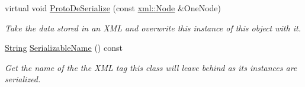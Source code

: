 \begin{DoxyCompactItemize}
virtual void \hyperlink{classphys_1_1Vector3_a2b1f6cb180e84747d34092cb5aeeb14b}{ProtoDeSerialize} (const \hyperlink{classphys_1_1xml_1_1Node}{xml::Node} \&OneNode)
\begin{DoxyCompactList}\small\item\em Take the data stored in an XML and overwrite this instance of this object with it. \item\end{DoxyCompactList}\item 
\hyperlink{namespacephys_aa03900411993de7fbfec4789bc1d392e}{String} \hyperlink{classphys_1_1Vector3_afce4c1d9b2ed48bea39a6d7b66af240e}{SerializableName} () const 
\begin{DoxyCompactList}\small\item\em Get the name of the the XML tag this class will leave behind as its instances are serialized. \item\end{DoxyCompactList}\end{DoxyCompactItemize}
